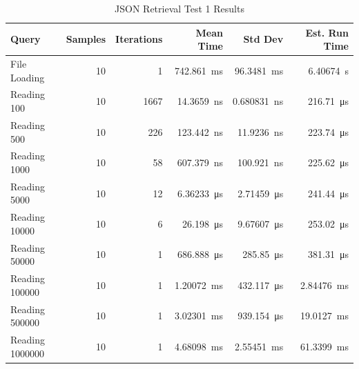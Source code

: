 \documentclass[14pt,a4paper]{article}
\begin{document}
    \begin{table}[H]
        \centering        
        \begin{tabular}{lrrrrr}
            \toprule
            \textbf{Query} & \textbf{Samples} & \textbf{Iterations} & \textbf{Mean Time} & \textbf{Std Dev} & \textbf{Est. Run Time} \\
            \midrule
            File Loading & 10 & 1 & \qty{742.861}{\milli\second} & \qty{96.3481}{\milli\second} & \qty{6.40674}{\second} \\
            Reading 100 & 10 & 1667 & \qty{14.3659}{\nano\second} & \qty{0.680831}{\nano\second} & \qty{216.71}{\micro\second} \\
            Reading 500 & 10 & 226 & \qty{123.442}{\nano\second} & \qty{11.9236}{\nano\second} & \qty{223.74}{\micro\second} \\
            Reading 1000 & 10 & 58 & \qty{607.379}{\nano\second} & \qty{100.921}{\nano\second} & \qty{225.62}{\micro\second} \\
            Reading 5000 & 10 & 12 & \qty{6.36233}{\micro\second} & \qty{2.71459}{\micro\second} & \qty{241.44}{\micro\second} \\
            Reading 10000 & 10 & 6 & \qty{26.198}{\micro\second} & \qty{9.67607}{\micro\second} & \qty{253.02}{\micro\second} \\
            Reading 50000 & 10 & 1 & \qty{686.888}{\micro\second} & \qty{285.85}{\micro\second} & \qty{381.31}{\micro\second} \\
            Reading 100000 & 10 & 1 & \qty{1.20072}{\milli\second} & \qty{432.117}{\micro\second} & \qty{2.84476}{\milli\second} \\
            Reading 500000 & 10 & 1 & \qty{3.02301}{\milli\second} & \qty{939.154}{\micro\second} & \qty{19.0127}{\milli\second} \\
            Reading 1000000 & 10 & 1 & \qty{4.68098}{\milli\second} & \qty{2.55451}{\milli\second} & \qty{61.3399}{\milli\second} \\
            \bottomrule
        \end{tabular}
        \caption{JSON Retrieval Test 1 Results}
    \end{table}
    
\end{document}
